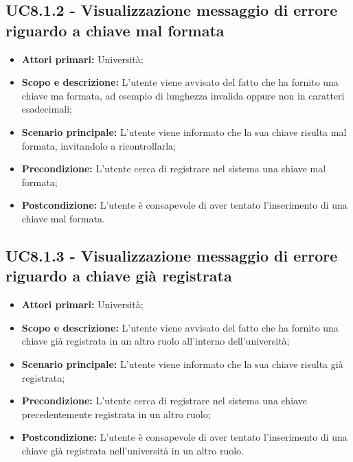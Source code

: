 \documentclass[AnalisiDeiRequisiti.tex]{subfiles}
\begin{document}
\subsection{UC8.1.2 - Visualizzazione messaggio di errore riguardo a chiave mal formata}
\begin{itemize}
	\item \textbf{Attori primari:} Università;\\
	\item \textbf{Scopo e descrizione:} L'utente viene avvisato del fatto che ha fornito una chiave ma formata, ad esempio di lunghezza invalida oppure non in caratteri esadecimali;\\
	\item \textbf{Scenario principale:} L'utente viene informato che la sua chiave risulta mal formata, invitandolo a ricontrollarla;\\
	\item \textbf{Precondizione:} L'utente cerca di registrare nel sistema una chiave mal formata;\\
	\item \textbf{Postcondizione:} L'utente è consapevole di aver tentato l'inserimento di una chiave mal formata.\\
\end{itemize}
\subsection{UC8.1.3 - Visualizzazione messaggio di errore riguardo a chiave già registrata}
\begin{itemize}
	\item \textbf{Attori primari:} Università;\\
	\item \textbf{Scopo e descrizione:} L'utente viene avvisato del fatto che ha fornito una chiave già registrata in un altro ruolo all'interno dell'università;\\
	\item \textbf{Scenario principale:} L'utente viene informato che la sua chiave risulta già registrata;\\
	\item \textbf{Precondizione:} L'utente cerca di registrare nel sistema una chiave precedentemente registrata in un altro ruolo;\\
	\item \textbf{Postcondizione:} L'utente è consapevole di aver tentato l'inserimento di una chiave già registrata nell'università in un altro ruolo.\\
\end{itemize}
\end{document}
